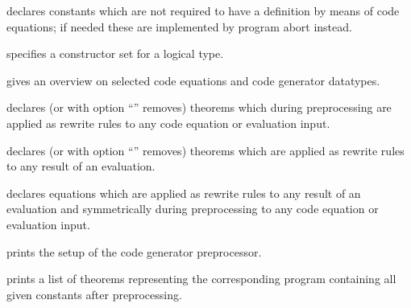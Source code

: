 \begin{isabellebody}
\begin{isamarkuptext}
\begin{description}
  \item \hyperlink{command.HOL.code-abort}{\mbox{}} declares constants which are not
  required to have a definition by means of code equations; if needed
  these are implemented by program abort instead.

  \item \hyperlink{command.HOL.code-datatype}{\mbox{}} specifies a constructor set
  for a logical type.

  \item \hyperlink{command.HOL.print-codesetup}{\mbox{}} gives an overview on
  selected code equations and code generator datatypes.

  \item \hyperlink{attribute.HOL.code-unfold}{\mbox{}} declares (or with option
  ``'' removes) theorems which during preprocessing
  are applied as rewrite rules to any code equation or evaluation
  input.

  \item \hyperlink{attribute.HOL.code-post}{\mbox{}} declares (or with option ``'' removes) theorems which are applied as rewrite rules to any
  result of an evaluation.

  \item \hyperlink{attribute.HOL.code-abbrev}{\mbox{}} declares equations which are
  applied as rewrite rules to any result of an evaluation and
  symmetrically during preprocessing to any code equation or evaluation
  input.

  \item \hyperlink{command.HOL.print-codeproc}{\mbox{}} prints the setup of the code
  generator preprocessor.

  \item \hyperlink{command.HOL.code-thms}{\mbox{}} prints a list of theorems
  representing the corresponding program containing all given
  constants after preprocessing.


\end{description}
\end{isamarkuptext}
\end{isabellebody}
